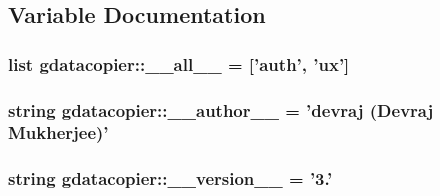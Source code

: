 \subsection{\-Variable \-Documentation}
\hypertarget{namespacegdatacopier_adc7a412325fefd36f91164fc74204536}{
\subsubsection[{\-\_\-\-\_\-all\-\_\-\-\_\-}]{\setlength{\rightskip}{0pt plus 5cm}list {\bf gdatacopier\-::\-\_\-\-\_\-all\-\_\-\-\_\-} = \mbox{[}'auth', 'ux'\mbox{]}}}\label{namespacegdatacopier_adc7a412325fefd36f91164fc74204536}
\hypertarget{namespacegdatacopier_a04afb4dbe5ef068f0e1098b8ca4cbbc7}{
\subsubsection[{\-\_\-\-\_\-author\-\_\-\-\_\-}]{\setlength{\rightskip}{0pt plus 5cm}string {\bf gdatacopier\-::\-\_\-\-\_\-author\-\_\-\-\_\-} = 'devraj (\-Devraj \-Mukherjee)'}}\label{namespacegdatacopier_a04afb4dbe5ef068f0e1098b8ca4cbbc7}
\hypertarget{namespacegdatacopier_ad865e398b52c0688549ea241ebb13de1}{
\subsubsection[{\-\_\-\-\_\-version\-\_\-\-\_\-}]{\setlength{\rightskip}{0pt plus 5cm}string {\bf gdatacopier\-::\-\_\-\-\_\-version\-\_\-\-\_\-} = '3.'}}\label{namespacegdatacopier_ad865e398b52c0688549ea241ebb13de1}
